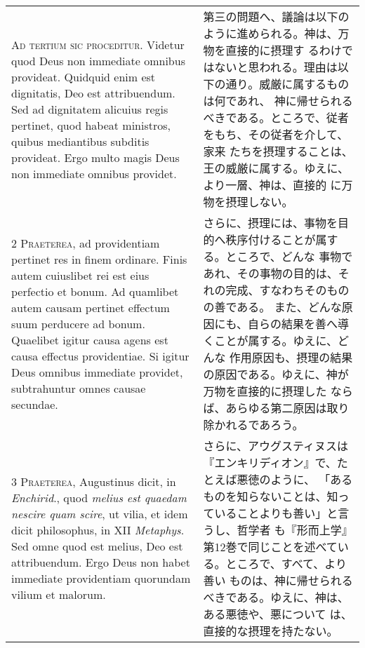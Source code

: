 \documentclass[10pt]{jsarticle} %
\begin{document}
\begin{longtable}{p{21em}p{21em}}

{\Huge A}{\scshape d tertium sic proceditur}. Videtur quod
Deus non immediate omnibus provideat. Quidquid enim est dignitatis, Deo
est attribuendum. Sed ad dignitatem alicuius regis pertinet, quod habeat
ministros, quibus mediantibus subditis provideat. Ergo multo magis Deus
non immediate omnibus providet.

&

第三の問題へ、議論は以下のように進められる。神は、万物を直接的に摂理す
るわけではないと思われる。理由は以下の通り。威厳に属するものは何であれ、
神に帰せられるべきである。ところで、従者をもち、その従者を介して、家来
たちを摂理することは、王の威厳に属する。ゆえに、より一層、神は、直接的
に万物を摂理しない。
 
\\


2 {\scshape Praeterea}, ad providentiam pertinet res in
finem ordinare. Finis autem cuiuslibet rei est eius perfectio et
bonum. Ad quamlibet autem causam pertinet effectum suum perducere ad
bonum. Quaelibet igitur causa agens est causa effectus providentiae. Si
igitur Deus omnibus immediate providet, subtrahuntur omnes causae
secundae.

&

さらに、摂理には、事物を目的へ秩序付けることが属する。ところで、どんな
事物であれ、その事物の目的は、それの完成、すなわちそのものの善である。
また、どんな原因にも、自らの結果を善へ導くことが属する。ゆえに、どんな
作用原因も、摂理の結果の原因である。ゆえに、神が万物を直接的に摂理した
ならば、あらゆる第二原因は取り除かれるであろう。

\\


3 {\scshape Praeterea}, Augustinus dicit, in {\itshape Enchirid}.,
quod {\itshape melius est quaedam nescire quam scire}, ut vilia, et idem dicit
philosophus, in XII {\itshape Metaphys}. Sed omne quod est melius, Deo est
attribuendum. Ergo Deus non habet immediate providentiam quorundam
vilium et malorum.

&

さらに、アウグスティヌスは『エンキリディオン』で、たとえば悪徳のように、
「あるものを知らないことは、知っていることよりも善い」と言うし、哲学者
も『形而上学』第12巻で同じことを述べている。ところで、すべて、より善い
ものは、神に帰せられるべきである。ゆえに、神は、ある悪徳や、悪について
は、直接的な摂理を持たない。

\\



\end{longtable}
\end{document}
